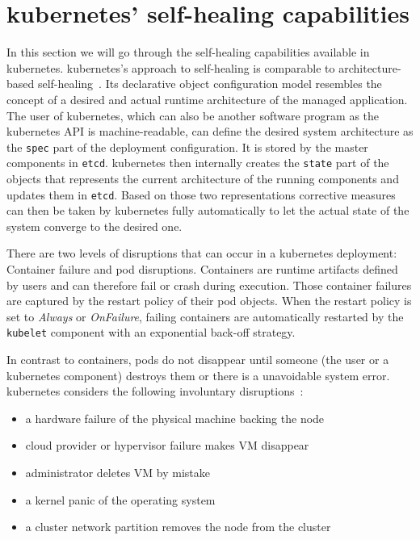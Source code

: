 
\section{\Gls{kubernetes}' self-healing capabilities}
  In this section we will go through the self-healing capabilities available in \gls{kubernetes}.
  \gls{kubernetes}'s approach to self-healing is comparable to architecture-based self-healing~\cite{ToffettiMicroservices,DashofyArchitecture}.
  Its declarative object configuration model resembles the concept of a desired and actual runtime architecture of the managed application.
  The user of \gls{kubernetes}, which can also be another software program as the \gls{kubernetes} API is machine-readable, can define the desired system architecture as the \texttt{spec} part of the deployment configuration.
  It is stored by the master components in \texttt{etcd}.
  \Gls{kubernetes} then internally creates the \texttt{state} part of the objects that represents the current architecture of the running components and updates them in \texttt{etcd}.
  Based on those two representations corrective measures can then be taken by \gls{kubernetes} fully automatically to let the actual state of the system converge to the desired one.

  There are two levels of disruptions that can occur in a \gls{kubernetes} deployment: Container failure and pod disruptions.
  Containers are runtime artifacts defined by users and can therefore fail or crash during execution.
  Those container failures are captured by the restart policy of their pod objects.
  When the restart policy is set to \textit{Always} or \textit{OnFailure}, failing containers are automatically restarted by the \texttt{kubelet} component with an exponential back-off strategy.

  In contrast to containers, pods do not disappear until someone (the user or a \gls{kubernetes} component) destroys them or there is a unavoidable system error.
  \Gls{kubernetes} considers the following involuntary disruptions~\cite{kubernetes}:

  \begin{itemize}
    \item a hardware failure of the physical machine backing the node
    \item cloud provider or hypervisor failure makes VM disappear
    \item administrator deletes VM by mistake
    \item a kernel panic of the operating system
    \item a cluster network partition removes the node from the cluster
  \end{itemize}

